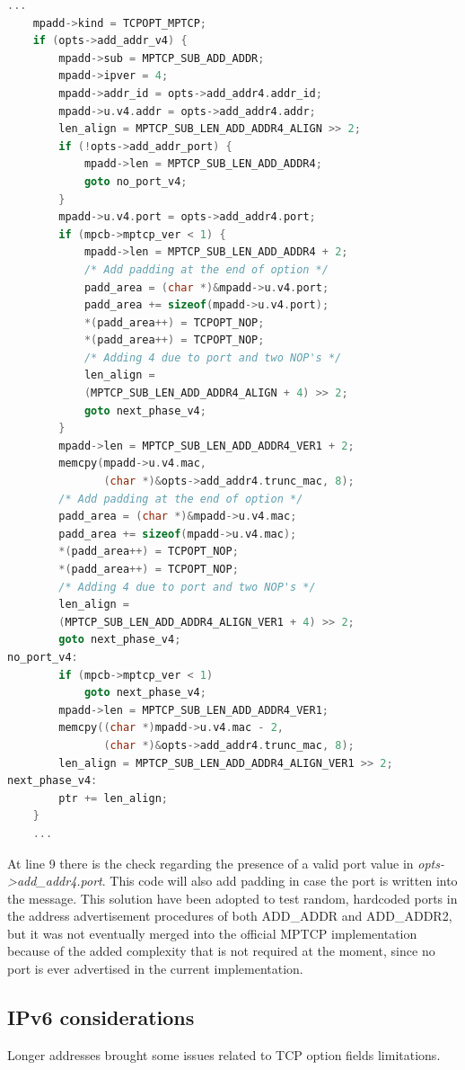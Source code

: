 \begin{lstlisting}[language=c, caption=\textit{Code to write the outgoing ADD\_ADDR(2) packet, with added support for the port value}, label=outport]
	...
	mpadd->kind = TCPOPT_MPTCP;
	if (opts->add_addr_v4) {
		mpadd->sub = MPTCP_SUB_ADD_ADDR;
		mpadd->ipver = 4;
		mpadd->addr_id = opts->add_addr4.addr_id;
		mpadd->u.v4.addr = opts->add_addr4.addr;
		len_align = MPTCP_SUB_LEN_ADD_ADDR4_ALIGN >> 2;
		if (!opts->add_addr_port) {
			mpadd->len = MPTCP_SUB_LEN_ADD_ADDR4;
			goto no_port_v4;
		}
		mpadd->u.v4.port = opts->add_addr4.port;
		if (mpcb->mptcp_ver < 1) {
			mpadd->len = MPTCP_SUB_LEN_ADD_ADDR4 + 2;
			/* Add padding at the end of option */
			padd_area = (char *)&mpadd->u.v4.port;
			padd_area += sizeof(mpadd->u.v4.port);
			*(padd_area++) = TCPOPT_NOP;
			*(padd_area++) = TCPOPT_NOP;
			/* Adding 4 due to port and two NOP's */
			len_align =
			(MPTCP_SUB_LEN_ADD_ADDR4_ALIGN + 4) >> 2;
			goto next_phase_v4;
		}
		mpadd->len = MPTCP_SUB_LEN_ADD_ADDR4_VER1 + 2;
		memcpy(mpadd->u.v4.mac,
		       (char *)&opts->add_addr4.trunc_mac, 8);
		/* Add padding at the end of option */
		padd_area = (char *)&mpadd->u.v4.mac;
		padd_area += sizeof(mpadd->u.v4.mac);
		*(padd_area++) = TCPOPT_NOP;
		*(padd_area++) = TCPOPT_NOP;
		/* Adding 4 due to port and two NOP's */
		len_align =
		(MPTCP_SUB_LEN_ADD_ADDR4_ALIGN_VER1 + 4) >> 2;
		goto next_phase_v4;
no_port_v4:
		if (mpcb->mptcp_ver < 1)
			goto next_phase_v4;
		mpadd->len = MPTCP_SUB_LEN_ADD_ADDR4_VER1;
		memcpy((char *)mpadd->u.v4.mac - 2,
		       (char *)&opts->add_addr4.trunc_mac, 8);
		len_align = MPTCP_SUB_LEN_ADD_ADDR4_ALIGN_VER1 >> 2;
next_phase_v4:
		ptr += len_align;
	}
	...
\end{lstlisting}

At line 9 there is the check regarding the presence of a valid port value in \textit{opts->add\_addr4.port}. This code will also add padding in case the port is written into the message. This solution have been adopted to test random, hardcoded ports in the address advertisement procedures of both ADD\_ADDR and ADD\_ADDR2, but it was not eventually merged into the official MPTCP implementation because of the added complexity that is not required at the moment, since no port is ever advertised in the current implementation.


\subsection{IPv6 considerations}
Longer addresses brought some issues related to TCP option fields limitations.


